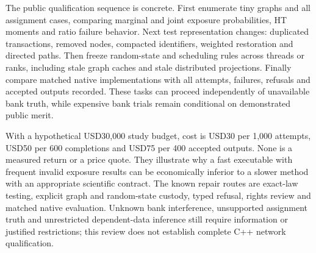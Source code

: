 The public qualification sequence is concrete. First enumerate tiny graphs and all assignment cases, comparing marginal and joint exposure probabilities, HT moments and ratio failure behavior. Next test representation changes: duplicated transactions, removed nodes, compacted identifiers, weighted restoration and directed paths. Then freeze random-state and scheduling rules across threads or ranks, including stale graph caches and stale distributed projections. Finally compare matched native implementations with all attempts, failures, refusals and accepted outputs recorded. These tasks can proceed independently of unavailable bank truth, while expensive bank trials remain conditional on demonstrated public merit.~\citep{exec25_cnet_choice}

With a hypothetical USD30,000 study budget, cost is USD30 per 1,000 attempts, USD50 per 600 completions and USD75 per 400 accepted outputs. None is a measured return or a price quote. They illustrate why a fast executable with frequent invalid exposure results can be economically inferior to a slower method with an appropriate scientific contract. The known repair routes are exact-law testing, explicit graph and random-state custody, typed refusal, rights review and matched native evaluation. Unknown bank interference, unsupported assignment truth and unrestricted dependent-data inference still require information or justified restrictions; this review does not establish complete C++ network qualification.~\citep{exec25_cnet_choice}

